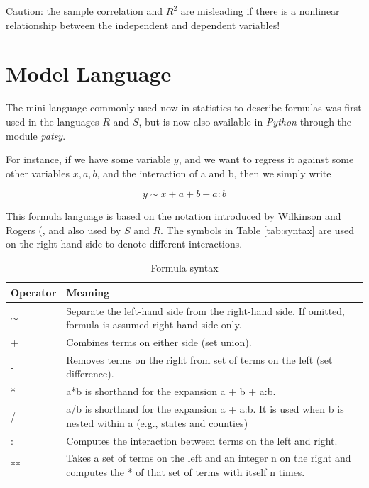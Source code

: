 Caution: the sample correlation and $R^2$ are misleading if there is a nonlinear relationship between the independent and dependent variables!


\section{Model Language}
The mini-language commonly used now in statistics to describe formulas was first used in the languages $R$ and $S$, but is now also available in \emph{Python} through the module \emph{patsy}.

For instance, if we have some variable $y$, and we want to regress it against some other variables $x, a, b$, and the interaction of a and b, then we simply write

\begin{equation}
    y \sim x + a + b + a:b
\end{equation}

This formula language is based on the notation introduced by Wilkinson and Rogers (\cite{Wilkinson1973}, and also used by $S$ and $R$.
The symbols in Table \ref{tab:syntax} are used on the right hand side to denote different interactions.

\begin{table}
  \centering
  \footnotesize{
  \begin{tabular}{ p{2cm} p{9cm} }
     Operator & Meaning \\
     \hline
    $\sim $ &	Separate the left-hand side from the right-hand side. If omitted, formula is assumed right-hand side only. \\
    + &	Combines terms on either side (set union). \\
    - &	Removes terms on the right from set of terms on the left (set difference). \\
    * &	a*b is shorthand for the expansion a + b + a:b. \\
    / &	a/b is shorthand for the expansion a + a:b. It is used when b is nested within a (e.g., states and counties) \\
    : &	Computes the interaction between terms on the left and right. \\
    ** & Takes a set of terms on the left and an integer n on the right and computes the * of that set of terms with itself n times.\\
     \hline
  \end{tabular}
  }
  \caption{Formula syntax}
\end{table}\label{tab:syntax}

